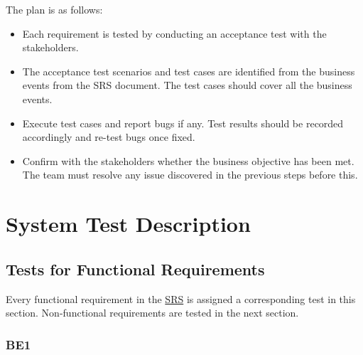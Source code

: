 \documentclass[12pt, titlepage]{article}
\begin{document}
The plan is as follows: 
\begin{itemize}
    \item Each requirement is tested by conducting an acceptance test with the
    stakeholders. 
    \item The acceptance test scenarios and test cases are identified from the
    business events from the SRS document. The test cases should cover all the
    business events.
    \item Execute test cases and report bugs if any. Test results should be
    recorded accordingly and re-test bugs once fixed.
    \item Confirm with the stakeholders whether the business objective has been
    met. The team must resolve any issue discovered in the previous steps before
    this.
\end{itemize}


\section{System Test Description}
	
\subsection{Tests for Functional Requirements}
\label{sec:5.1}
Every functional requirement in the
\href{https://github.com/parkd-app/park-d/blob/main/docs/SRS/SRS.pdf}{SRS} is
assigned a corresponding test in this section. Non-functional requirements are
tested in the next section.

		
\subsubsection{BE1}
\end{document}
